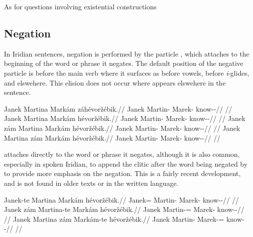 As for questions involving existential constructions


\subsection{Negation}

In Iridian sentences, negation is performed by the particle , which
attaches to the beginning of the word or phrase  it negates. The default
position of the negative particle is before the main verb where it surfaces as
 before vowels,  before \emph{i}-glides, and 
elswehere. This elision does not occur where  appears elswehere in
the sentence.

\pex
\a
\begingl
    \gla Janek Martina Markám {zá}hévoržébik.//
    \glb Janek Martin-\Acc{} Marek-\Agt{} \Neg{}know-\Ben{}-\Pf{}//
    \glft {}//
\endgl
\a
\begingl
     Janek Martina Markám hévoržébik.//
    \glb \Neg{} Janek Martin-\Acc{} Marek-\Agt{} know-\Ben{}-\Pf{}//
    \glft {}//
\endgl
\a
\begingl
    \gla Janek {zám} Martina Markám hévoržébik.//
    \glb Janek \Neg{} Martin-\Acc{} Marek-\Agt{} know-\Ben{}-\Pf{}//
    \glft {}//
\endgl
\a
\begingl
    \gla Janek Martina {zám} Markám hévoržébik.//
    \glb Janek Martin-\Acc{} \Neg{} Marek-\Agt{} know-\Ben{}-\Pf{}//
    \glft {}//
\endgl
\xe

 attaches directly to the word or phrase it negates, although it is
also common, especially in spoken Iridian, to append the clitic  after
the word being negated by  to provide more emphasis on the negation.
This is a fairly recent development, and is not found in older texts or in the
written language.

\pex
\a
\begingl
     Janek{-te} Martina Markám hévoržébik.//
    \glb \Neg{} Janek=\Foc{} Martin-\Acc{} Marek-\Agt{} know-\Ben{}-\Pf{}//
    \glft {}//
\endgl
\a
\begingl
    \gla Janek {zám} Martina{-te} Markám hévoržébik.//
    \glb Janek \Neg{} Martin-\Acc{}=\Foc{} Marek-\Agt{} know-\Ben{}-\Pf{}//
    \glft {}//
\endgl
\a
\begingl
    \gla Janek Martina {zám} Markám{-te} hévoržébik.//
    \glb Janek Martin-\Acc{} \Neg{} Marek-\Agt{}=\Foc{} know-\Ben{}-\Pf{}//
    \glft {}//
\endgl
\xe

